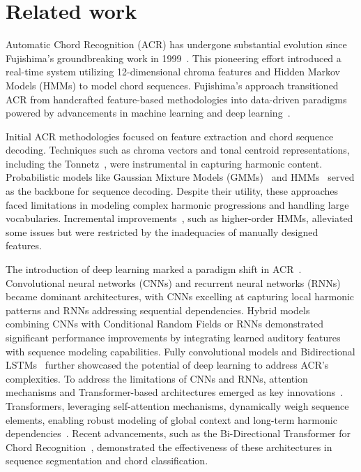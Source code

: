 \section{Related work}
\label{rw}

Automatic Chord Recognition (ACR) has undergone substantial evolution since Fujishima's groundbreaking work in 1999~\cite{takuya1999realtime}. This pioneering effort introduced a real-time system utilizing 12-dimensional chroma features and Hidden Markov Models (HMMs) to model chord sequences. Fujishima’s approach transitioned ACR from handcrafted feature-based methodologies into data-driven paradigms powered by advancements in machine learning and deep learning~\cite{mcvicar2014automatic}.

Initial ACR methodologies focused on feature extraction and chord sequence decoding. Techniques such as chroma vectors and tonal centroid representations, including the Tonnetz~\cite{humphrey2012learning}, were instrumental in capturing harmonic content. Probabilistic models like Gaussian Mixture Models (GMMs)~\cite{khadkevich2013reassigned} and HMMs~\cite{ueda2010hmm,sheh2003chord, khadkevich2009use} served as the backbone for sequence decoding. Despite their utility, these approaches faced limitations in modeling complex harmonic progressions and handling large vocabularies. Incremental improvements~\cite{ni2012end, mauch2010approximate}, such as higher-order HMMs, alleviated some issues but were restricted by the inadequacies of manually designed features.

The introduction of deep learning marked a paradigm shift in ACR~\cite{korzeniowski2016feature, sigtia2015audio, zhou2015chord}. Convolutional neural networks (CNNs) and recurrent neural networks (RNNs)~\cite{jiang2019large,humphrey2012rethinking,mcfee2017structured,wu2018automatic,boulanger2013audio,deng2016hybrid,deng2017large} became dominant architectures, with CNNs excelling at capturing local harmonic patterns and RNNs addressing sequential dependencies. Hybrid models~\cite{korzeniowski2016fully,lanz2021automatic} combining CNNs with Conditional Random Fields or RNNs demonstrated significant performance improvements by integrating learned auditory features with sequence modeling capabilities. Fully convolutional models and Bidirectional LSTMs~\cite{jiang2019large, wu2018automatic} further showcased the potential of deep learning to address ACR's complexities. To address the limitations of CNNs and RNNs, attention mechanisms and Transformer-based architectures emerged as key innovations~\cite{vaswani2017attention}. Transformers, leveraging self-attention mechanisms, dynamically weigh sequence elements, enabling robust modeling of global context and long-term harmonic dependencies~\cite{gulati2020conformer}. Recent advancements, such as the Bi-Directional Transformer for Chord Recognition~\cite{park2019bi}, demonstrated the effectiveness of these architectures in sequence segmentation and chord classification.

